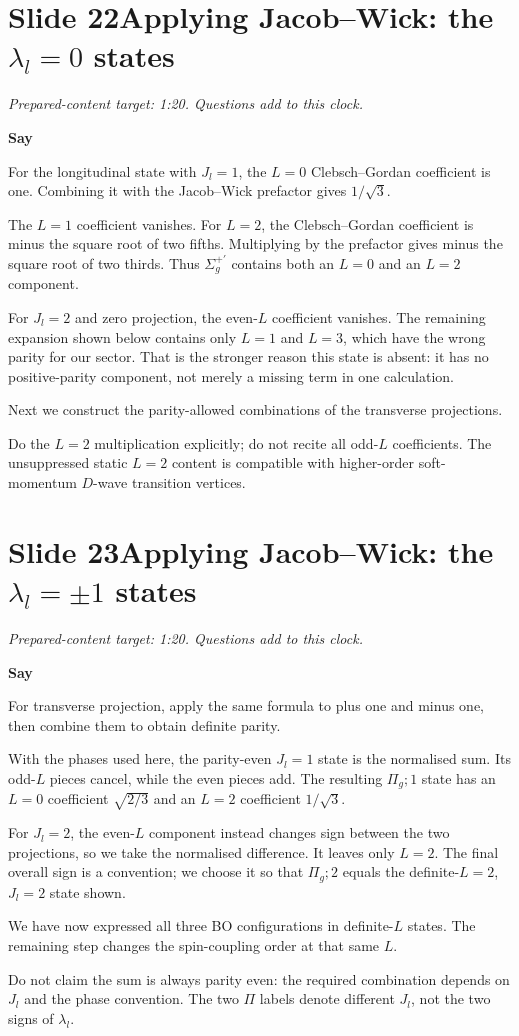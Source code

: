 \documentclass[11pt,a4paper]{article}
\newcommand{\Sigmap}{\Sigma_g^{+\prime}}
\newcommand{\cue}[1]{\begin{private}#1\end{private}}
\newenvironment{speech}{\par\textbf{Say}\par}{\par}
\newcommand{\slidenote}[3]{%
  \clearpage
  \pdfbookmark[1]{Slide #1}{slide-#1}%
  \section*{Slide #1\quad #2}
  \textit{Prepared-content target: #3. Questions add to this clock.}\par
}
\begin{document}
\slidenote{22}{Applying Jacob--Wick: the $\lambda_l=0$ states}{1:20}
\begin{speech}
For the longitudinal state with $J_l=1$, the $L=0$ Clebsch--Gordan
coefficient is one. Combining it with the Jacob--Wick prefactor gives
$1/\sqrt3$.

The $L=1$ coefficient vanishes. For $L=2$, the Clebsch--Gordan
coefficient is minus the square root of two fifths. Multiplying by
the prefactor gives minus the square root of two thirds. Thus
$\Sigmap$ contains both an $L=0$ and an $L=2$ component.

For $J_l=2$ and zero projection, the even-$L$ coefficient vanishes.
The remaining expansion shown below contains only $L=1$ and $L=3$,
which have the wrong parity for our sector. That is the stronger
reason this state is absent: it has no positive-parity component,
not merely a missing term in one calculation.

Next we construct the parity-allowed combinations of the transverse
projections.
\end{speech}
\cue{Do the $L=2$ multiplication explicitly; do not recite all odd-$L$
coefficients. The unsuppressed static $L=2$ content is compatible with
higher-order soft-momentum $D$-wave transition vertices.}

\slidenote{23}{Applying Jacob--Wick: the $\lambda_l=\pm1$ states}{1:20}
\begin{speech}
For transverse projection, apply the same formula to plus one and
minus one, then combine them to obtain definite parity.

With the phases used here, the parity-even $J_l=1$ state is the
normalised sum. Its odd-$L$ pieces cancel, while the even pieces
add. The resulting $\Pi_g;1$ state has an $L=0$ coefficient
$\sqrt{2/3}$ and an $L=2$ coefficient $1/\sqrt3$.

For $J_l=2$, the even-$L$ component instead changes sign between
the two projections, so we take the normalised difference. It leaves
only $L=2$. The final overall sign is a convention; we choose it
so that $\Pi_g;2$ equals the definite-$L=2$, $J_l=2$ state shown.

We have now expressed all three BO configurations in definite-$L$
states. The remaining step changes the spin-coupling order at that
same $L$.
\end{speech}
\cue{Do not claim the sum is always parity even: the required combination
depends on $J_l$ and the phase convention. The two $\Pi$ labels denote
different $J_l$, not the two signs of $\lambda_l$.}
\end{document}
